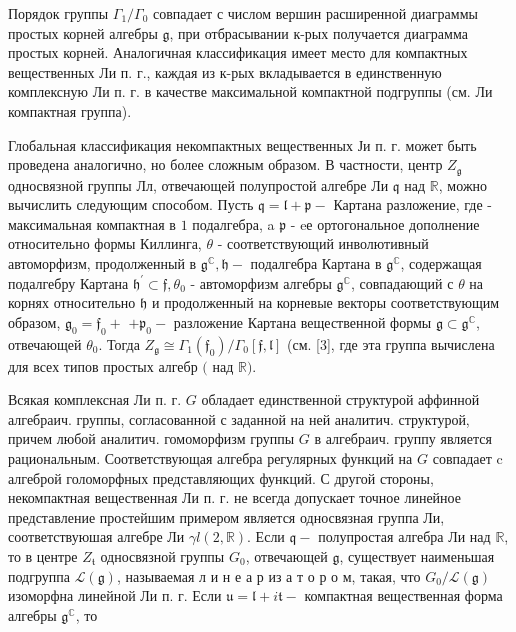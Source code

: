\documentclass[10pt]{article}
\begin{document}
Порядок группы $\Gamma_{1} / \Gamma_{0}$ совпадает с числом вершин расширенной диаграммы простых корней алгебры $\mathfrak{g}$, при отбрасывании к-рых получается диаграмма простых корней. Аналогичная классификация имеет место для компактных вещественных Ли п. г., каждая из к-рых вкладывается в единственную комплексную Ли п. г. в качестве максимальной компактной подгруппы (см. Ли компактная группа).



Глобальная классификация некомпактных вещественных Ји п. г. может быть проведена аналогично, но более сложным образом. В частности, центр $Z_{\mathfrak{g}}$ односвязной группы Лл, отвечающей полупростой алгебре Ли $\mathfrak{q}$ над $\mathbb{R}$, можно вычислить следующим способом. Пусть $\mathfrak{q}=\mathfrak{l}+\mathfrak{p}-$ Картана разложение, где - максимальная компактная в $\mathfrak{1}$ подалгебра, a $\mathfrak{p}$ - eе ортогональное дополнение относительно формы Киллинга, $\theta$ - соответствующий инволютивный автоморфизм, продолженный в $\mathfrak{g}^{\mathbb{C}}, \mathfrak{h}-$ подалгебра Картана в $\mathfrak{g}^{\mathbb{C}}$, содержащая подалгебру Картана $\mathfrak{h}^{\prime} \subset \mathfrak{f}, \theta_{0}$ - автоморфизм алгебры $\mathfrak{g}^{\mathbb{C}}$, совпадающий с $\theta$ на корнях относительно $\mathfrak{h}$ и продолженный на корневые векторы соответствующим образом, $\mathfrak{g}_{0}=\mathfrak{f}_{0}+$ $+\mathfrak{p}_{0}-$ разложение Картана вещественной формы $\mathfrak{g} \subset \mathfrak{g}^{\mathbb{C}}$, отвечающей $\theta_{0}$. Тогда $Z_{\mathfrak{g}} \cong \Gamma_{1}\left(\mathfrak{f}_{0}\right) / \Gamma_{0}[\mathfrak{f}, \mathfrak{l}]$ (см. [3], где эта группа вычислена для всех типов простых алгебр $($ над $\mathbb{R})$.



Всякая комплексная Ли п. г. $G$ обладает единственноӥ структурой аффинной алгебраич. группы, согласованной с заданной на ней аналитич. структурой, причем любой аналитич. гомоморфизм группы $G$ в алгебраич. группу является рациональным. Соответствующая алгебра регулярных функций на $G$ совпадает c алгеброй голоморфных представляющих функций. С другой стороны, некомпактная вещественная Ли п. г. не всегда допускает точное линейное представление простейшим примером является односвязная группа Ли, соответствуюшая алгебре Ли $\gamma l(2, \mathbb{R})$. Если $\mathfrak{q}-$ полупростая алгебра Ли над $\mathbb{R}$, то в центре $Z_{\mathfrak{t}}$ односвязной группы $G_{0}$, отвечающей $\mathfrak{g}$, существует наименьшая подгруппа $\mathscr{L}(\mathfrak{g})$, называемая л и н е а р из а т о р о м, такая, что $G_{0} / \mathscr{L}(\mathfrak{g})$ изоморфна линейной Ли п. г. Если $\mathfrak{u}=\mathfrak{l}+i \mathfrak{t}-$ компактная вещественная форма алгебры $\mathfrak{g}^{\mathbb{C}}$, то
\end{document}
